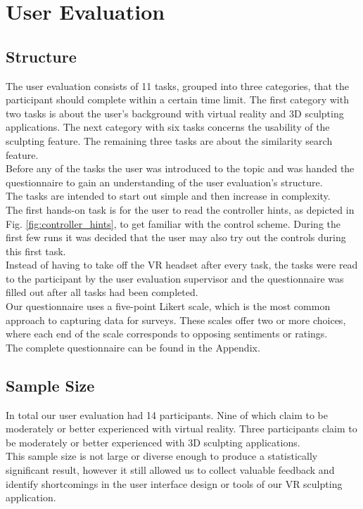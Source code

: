 \section{User Evaluation}

\subsection{Structure}

The user evaluation consists of 11 tasks, grouped into three categories, that the participant should complete within a certain time limit. The first category with two tasks is about the user's background with virtual reality and 3D sculpting applications. The next category with six tasks concerns the usability of the sculpting feature. The remaining three tasks are about the similarity search feature.\\
Before any of the tasks the user was introduced to the topic and was handed the questionnaire to gain an understanding of the user evaluation's structure.\\
The tasks are intended to start out simple and then increase in complexity.\\
The first hands-on task is for the user to read the controller hints, as depicted in Fig. \ref{fig:controller_hints}, to get familiar with the control scheme. During the first few runs it was decided that the user may also try out the controls during this first task.\\
Instead of having to take off the VR headset after every task, the tasks were read to the participant by the user evaluation supervisor and the questionnaire was filled out after all tasks had been completed.\\
Our questionnaire uses a five-point Likert scale, which is the most common approach to capturing data for surveys. These scales offer two or more choices, where each end of the scale corresponds to opposing sentiments or ratings.\\
The complete questionnaire can be found in the Appendix.

\subsection{Sample Size}

In total our user evaluation had 14 participants. Nine of which claim to be moderately or better experienced with virtual reality. Three participants claim to be moderately or better experienced with 3D sculpting applications.\\
This sample size is not large or diverse enough to produce a statistically significant result, however it still allowed us to collect valuable feedback and identify shortcomings in the user interface design or tools of our VR sculpting application.

